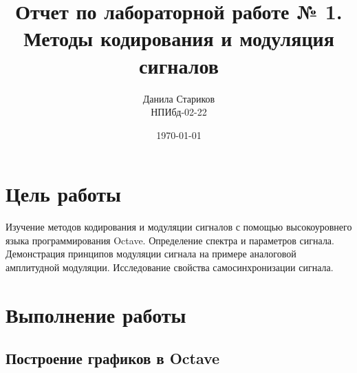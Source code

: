 

\title{Отчет по лабораторной работе № 1. \\ Методы кодирования и модуляция сигналов}
\author{Данила Стариков \\ НПИбд-02-22}
\date{\today}



\maketitle
\newpage

\tableofcontents

\newpage
\section{Цель работы}
Изучение методов кодирования и модуляции сигналов с помощью высокоуровнего языка
программирования Octave. Определение спектра и параметров
сигнала. Демонстрация принципов модуляции сигнала на примере аналоговой
амплитудной модуляции. Исследование свойства самосинхронизации сигнала.
\newpage
\section{Выполнение работы}
\subsection{Построение графиков в Octave}

